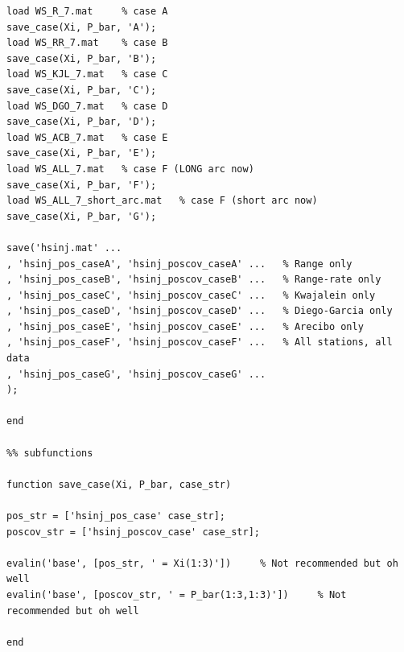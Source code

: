 \documentclass[conf]{new-aiaa}
\begin{document}
\begin{lstlisting}
load WS_R_7.mat     % case A 
save_case(Xi, P_bar, 'A'); 
load WS_RR_7.mat    % case B 
save_case(Xi, P_bar, 'B'); 
load WS_KJL_7.mat   % case C 
save_case(Xi, P_bar, 'C'); 
load WS_DGO_7.mat   % case D 
save_case(Xi, P_bar, 'D'); 
load WS_ACB_7.mat   % case E 
save_case(Xi, P_bar, 'E'); 
load WS_ALL_7.mat   % case F (LONG arc now) 
save_case(Xi, P_bar, 'F'); 
load WS_ALL_7_short_arc.mat   % case F (short arc now) 
save_case(Xi, P_bar, 'G'); 

save('hsinj.mat' ... 
, 'hsinj_pos_caseA', 'hsinj_poscov_caseA' ...   % Range only 
, 'hsinj_pos_caseB', 'hsinj_poscov_caseB' ...   % Range-rate only 
, 'hsinj_pos_caseC', 'hsinj_poscov_caseC' ...   % Kwajalein only 
, 'hsinj_pos_caseD', 'hsinj_poscov_caseD' ...   % Diego-Garcia only 
, 'hsinj_pos_caseE', 'hsinj_poscov_caseE' ...   % Arecibo only 
, 'hsinj_pos_caseF', 'hsinj_poscov_caseF' ...   % All stations, all data 
, 'hsinj_pos_caseG', 'hsinj_poscov_caseG' ... 
);  

end

%% subfunctions 

function save_case(Xi, P_bar, case_str)

pos_str = ['hsinj_pos_case' case_str]; 
poscov_str = ['hsinj_poscov_case' case_str]; 

evalin('base', [pos_str, ' = Xi(1:3)'])     % Not recommended but oh well 
evalin('base', [poscov_str, ' = P_bar(1:3,1:3)'])     % Not recommended but oh well 

end


\end{lstlisting}
\end{document}
